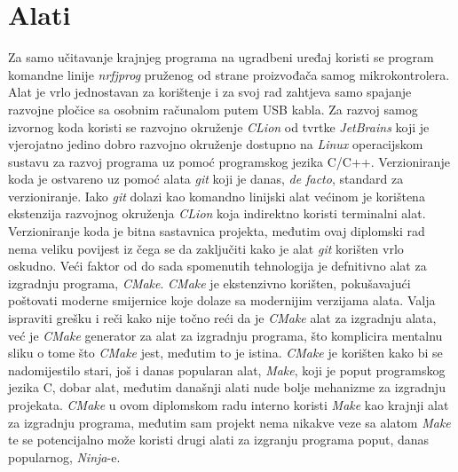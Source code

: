 \section{Alati}
Za samo učitavanje krajnjeg programa na ugradbeni uređaj koristi se program komandne linije \textit{nrfjprog} pruženog od strane proizvođača samog mikrokontrolera. Alat je vrlo jednostavan za korištenje i za svoj rad zahtjeva samo spajanje razvojne pločice sa osobnim računalom putem USB kabla. Za razvoj samog izvornog koda koristi se razvojno okruženje \textit{CLion} od tvrtke \textit{JetBrains} koji je vjerojatno jedino dobro razvojno okruženje dostupno na \textit{Linux} operacijskom sustavu za razvoj programa uz pomoć programskog jezika C/C++. Verzioniranje koda je ostvareno uz pomoć alata \textit{git} koji je danas, \textit{de facto}, standard za verzioniranje. Iako \textit{git} dolazi kao komandno linijski alat većinom je korištena ekstenzija razvojnog okruženja \textit{CLion} koja indirektno koristi terminalni alat. Verzioniranje koda je bitna sastavnica projekta, međutim ovaj diplomski rad nema veliku povijest iz čega se da zaključiti kako je alat \textit{git} korišten vrlo oskudno. Veći faktor od do sada spomenutih tehnologija je defnitivno alat za izgradnju programa, \textit{CMake}. \textit{CMake} je ekstenzivno korišten, pokušavajući poštovati moderne smijernice koje dolaze sa modernijim verzijama alata. Valja ispraviti grešku i reči kako nije točno reći da je \textit{CMake} alat za izgradnju alata, već je \textit{CMake} generator za alat za izgradnju programa, što komplicira mentalnu sliku o tome što \textit{CMake} jest, međutim to je istina. \textit{CMake} je korišten kako bi se nadomijestilo stari, još i danas popularan alat, \textit{Make}, koji je poput programskog jezika C, dobar alat, međutim današnji alati nude bolje mehanizme za izgradnju projekata. \textit{CMake} u ovom diplomskom radu interno koristi \textit{Make} kao krajnji alat za izgradnju programa, međutim sam projekt nema nikakve veze sa alatom \textit{Make} te se potencijalno može koristi drugi alati za izgranju programa poput, danas popularnog, \textit{Ninja}-e.\\
